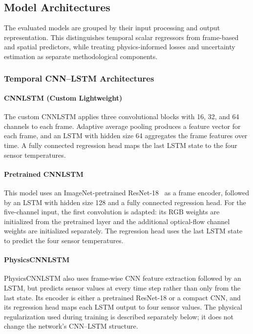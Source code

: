 \subsection{Model Architectures}
The evaluated models are grouped by their input processing and output
representation. This distinguishes temporal scalar regressors from frame-based
and spatial predictors, while treating physics-informed losses and uncertainty
estimation as separate methodological components.

\subsubsection{Temporal CNN--LSTM Architectures}

\paragraph{CNNLSTM (Custom Lightweight)}
The custom CNNLSTM applies three convolutional blocks with 16, 32, and 64
channels to each frame. Adaptive average pooling produces a feature vector for
each frame, and an LSTM with hidden size 64 aggregates the frame features over
time. A fully connected regression head maps the last LSTM state to the four
sensor temperatures.

\paragraph{Pretrained CNNLSTM}
This model uses an ImageNet-pretrained ResNet-18~\cite{he2016deep} as a frame encoder, followed
by an LSTM with hidden size 128 and a fully connected regression head. For the
five-channel input, the first convolution is adapted: its RGB weights are
initialized from the pretrained layer and the additional optical-flow channel
weights are initialized separately. The regression head uses the last LSTM
state to predict the four sensor temperatures.

\paragraph{PhysicsCNNLSTM}
PhysicsCNNLSTM also uses frame-wise CNN feature extraction followed by an LSTM,
but predicts sensor values at every time step rather than only from the last
state. Its encoder is either a pretrained ResNet-18 or a compact CNN, and its
regression head maps each LSTM output to four sensor values. The physical
regularization used during training is described separately below; it does
not change the network's CNN--LSTM structure.

